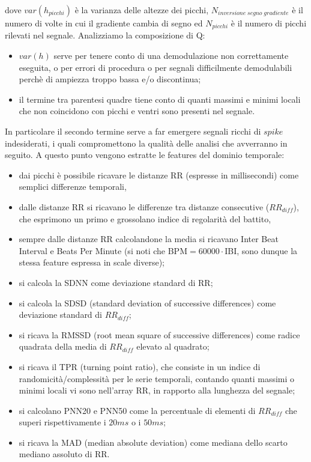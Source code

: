 \documentclass[a4paper, 12pt]{book}
\begin{document}
dove $var(h_{picchi})$ è la varianza delle altezze dei picchi, $N_{inversione\;segno\;gradiente}$ è il numero di volte in cui il gradiente cambia di segno ed $N_{picchi}$ è il numero di picchi rilevati nel segnale.
Analizziamo la composizione di Q:\begin{itemize}
	\item $var(h)$ serve per tenere conto di una demodulazione non correttamente 					  eseguita, o per errori di procedura o per segnali difficilmente demodulabili 				  perchè di ampiezza troppo bassa e/o discontinua;
	\item il termine tra parentesi quadre tiene conto di quanti massimi e minimi locali 		  che non coincidono con picchi e ventri sono presenti nel segnale.
\end{itemize}
In particolare il secondo termine serve a far emergere segnali ricchi di $spike$ indesiderati, i quali compromettono la qualità delle analisi che avverranno in seguito.
A questo punto vengono estratte le features del dominio temporale:\begin{itemize}
	\item dai picchi è possibile ricavare le distanze RR (espresse in millisecondi) 				  come semplici differenze temporali,
	\item dalle distanze RR si ricavano le differenze tra distanze consecutive 						  ($RR_{diff}$), che esprimono un primo e grossolano indice di regolarità del 				  battito,
	\item sempre dalle distanze RR calcolandone la media si ricavano Inter Beat 					  Interval e Beats Per Minute (si noti che BPM$ = 60000\cdot $IBI, sono dunque 				  la stessa feature espressa in scale diverse);
	\item si calcola la SDNN come deviazione standard di RR;
	\item si calcola la SDSD (standard deviation of successive differences) come 					  deviazione standard di $RR_{diff}$;
	\item si ricava la RMSSD (root mean square of successive differences) come 					  radice quadrata della media di $RR_{diff}$ elevato al quadrato;
	\item si ricava il TPR (turning point ratio), che consiste in un indice di 					  randomicità/complessità per le serie temporali, contando quanti massimi o 				  minimi locali vi sono nell'array RR, in rapporto alla lunghezza del segnale;
	\item si calcolano PNN20 e PNN50 come la percentuale di elementi di 				  	  	  $RR_{diff}$ che superi rispettivamente i $20ms$ o i $50ms$;
	\item si ricava la MAD (median absolute deviation) come mediana dello scarto 					  mediano assoluto di RR.
\end{itemize}
\end{document}
